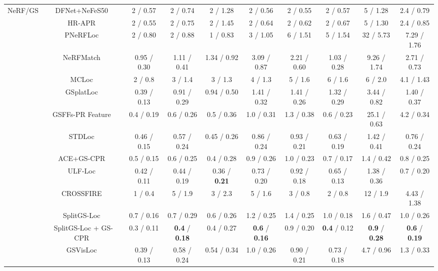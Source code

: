 \begin{table}[tp]
\begin{tabular}{lccccccccc}
\midrule
NeRF/GS & DFNet+NeFeS50~\cite{reported260504730v1bibbib27} & 2 / 0.57 & 2 / 0.74 & 2 / 1.28 & 2 / 0.56 & 2 / 0.55 & 2 / 0.57 & 5 / 1.28 & 2.4 / 0.79 \\
 & HR-APR~\cite{reported260504730v1bibbib58} & 2 / 0.55 & 2 / 0.75 & 2 / 1.45 & 2 / 0.64 & 2 / 0.62 & 2 / 0.67 & 5 / 1.30 & 2.4 / 0.85 \\
 & PNeRFLoc~\cite{reported250319358v1bibbib68} & 2 / 0.80 & 2 / 0.88 & 1 / 0.83 & 3 / 1.05 & 6 / 1.51 & 5 / 1.54 & 32 / 5.73 & 7.29 / 1.76 \\
 & NeRFMatch~\cite{zhou2024nerfmatch} & 0.95 / 0.30 & 1.11 / 0.41 & 1.34 / 0.92 & 3.09 / 0.87 & 2.21 / 0.60 & 1.03 / 0.28 & 9.26 / 1.74 & 2.71 / 0.73 \\
 & MCLoc~\cite{reported260504730v1bibbib57} & 2 / 0.8 & 3 / 1.4 & 3 / 1.3 & 4 / 1.3 & 5 / 1.6 & 6 / 1.6 & 6 / 2.0 & 4.1 / 1.43 \\
 & GSplatLoc~\cite{reported260504730v1bibbib47} & 0.39 / 0.13 & 0.91 / 0.29 & 0.94 / 0.50 & 1.41 / 0.32 & 1.41 / 0.26 & 1.32 / 0.29 & 3.44 / 0.82 & 1.40 / 0.37 \\
 & GSFFs-PR Feature~\cite{reported260504730v1bibbib52} & 0.4 / 0.19 & 0.6 / 0.26 & 0.5 / 0.36 & 1.0 / 0.31 & 1.3 / 0.38 & 0.6 / 0.23 & 25.1 / 0.63 & 4.2 / 0.34 \\
 & STDLoc~\cite{huang2025stdloc} & 0.46 / 0.15 & 0.57 / 0.24 & 0.45 / 0.26 & 0.86 / 0.24 & 0.93 / 0.21 & 0.63 / 0.19 & 1.42 / 0.41 & 0.76 / 0.24 \\
 & ACE+GS-CPR~\cite{reported260504730v1bibbib61} & 0.5 / 0.15 & 0.6 / 0.25 & 0.4 / 0.28 & 0.9 / 0.26 & 1.0 / 0.23 & 0.7 / 0.17 & 1.4 / 0.42 & 0.8 / 0.25 \\
 & ULF-Loc~\cite{gu2026ulfloc} & 0.42 / 0.11 & 0.44 / 0.19 & 0.36 / \textbf{0.21} & 0.73 / 0.20 & 0.92 / 0.18 & 0.65 / 0.13 & 1.38 / 0.36 & 0.7 / 0.20 \\
 & CROSSFIRE~\cite{reported260504730v1bibbib42} & 1 / 0.4 & 5 / 1.9 & 3 / 2.3 & 5 / 1.6 & 3 / 0.8 & 2 / 0.8 & 12 / 1.9 & 4.43 / 1.38 \\
 & SplitGS-Loc~\cite{lee2026splitgsloc} & 0.7 / 0.16 & 0.7 / 0.29 & 0.6 / 0.26 & 1.2 / 0.25 & 1.4 / 0.25 & 1.0 / 0.18 & 1.6 / 0.47 & 1.0 / 0.26 \\
 & SplitGS-Loc + GS-CPR~\cite{lee2026splitgsloc} & 0.3 / 0.11 & \textbf{0.4} / \textbf{0.18} & 0.4 / 0.27 & \textbf{0.6} / \textbf{0.16} & 0.9 / 0.20 & \textbf{0.4} / 0.12 & \textbf{0.9} / \textbf{0.28} & \textbf{0.6} / \textbf{0.19} \\
 & GSVisLoc~\cite{khatib2025gsvisloc} & 0.39 / 0.13 & 0.58 / 0.24 & 0.54 / 0.34 & 1.0 / 0.26 & 0.90 / 0.21 & 0.73 / 0.18 & 4.7 / 0.96 & 1.3 / 0.33 \\

\end{tabular}
\end{table}
